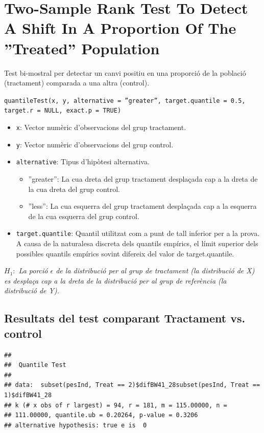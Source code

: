 \documentclass[11pt,a4paper]{article}\usepackage[]{graphicx}\usepackage[]{color}
\makeatletter
\newenvironment{kframe}{%
 \def\at@end@of@kframe{}%
 \ifinner\ifhmode%
  \def\at@end@of@kframe{\end{minipage}}%
  \begin{minipage}{\columnwidth}%
 \fi\fi%
 \def\FrameCommand##1{\hskip\@totalleftmargin \hskip-\fboxsep
 \colorbox{shadecolor}{##1}\hskip-\fboxsep
     \hskip-\linewidth \hskip-\@totalleftmargin \hskip\columnwidth}%
 \MakeFramed {\advance\hsize-\width
   \@totalleftmargin\z@ \linewidth\hsize
   \@setminipage}}%
 {\par\unskip\endMakeFramed%
 \at@end@of@kframe}
\newenvironment{knitrout}{}{} %
\makeatother
\begin{document}
\section{Two-Sample Rank Test To Detect A Shift In A Proportion Of The ''Treated'' Population}



Test bi-mostral per detectar un canvi positiu en una proporció de la població (tractament) comparada a una altra (control).

\texttt{quantileTest(x, y, alternative = ''greater'', target.quantile = 0.5, target.r = NULL, exact.p = TRUE)}
    
\begin{itemize}
  \item \texttt{x}: Vector numèric d'observacions del grup tractament.
  
  \item \texttt{y}: Vector numèric d'observacions del grup control.
  
  \item \texttt{alternative}: Tipus d'hipòtesi alternativa.

\begin{itemize}
      \item ''greater'': La cua dreta del grup tractament desplaçada cap a la dreta de la cua dreta del grup control.
      
      \item ''less'': La cua esquerra del grup tractament desplaçada cap a la esquerra de la cua esquerra del grup control.
\end{itemize}


  \item \texttt{target.quantile}: Quantil utilitzat com a punt de tall inferior per a la prova. A causa de la naturalesa discreta dels quantils empírics, el límit superior dels possibles quantils empírics sovint difereix del valor de target.quantile.

\end{itemize}

\textit{$H_1:$ La porció $\epsilon$ de la distribució per al grup de tractament (la distribució de X) es desplaça cap a la dreta de la distribució per al grup de referència (la distribució de Y).}



\subsection{Resultats del test comparant Tractament vs. control}
\begin{knitrout}
\color{fgcolor}\begin{kframe}
\begin{verbatim}
## 
## 	Quantile Test
## 
## data:  subset(pesInd, Treat == 2)$difBW41_28subset(pesInd, Treat == 1)$difBW41_28
## k (# x obs of r largest) = 94, r = 181, m = 115.00000, n =
## 111.00000, quantile.ub = 0.20264, p-value = 0.3206
## alternative hypothesis: true e is  0
\end{verbatim}
\end{kframe}
\end{knitrout}
\end{document}

